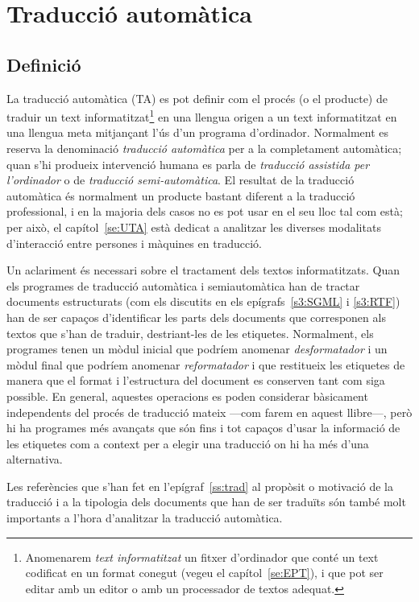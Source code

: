 \section{Traducció automàtica}
\label{ss:TA}

\subsection{Definició}

La traducció automàtica (TA) es pot definir com el procés (o el
producte) de traduir un text informatitzat\footnote{Anomenarem {\em
    text informatitzat} un fitxer d'ordinador que conté un text
  codificat en un format conegut (vegeu el capítol~\ref{se:EPT}), i que pot ser editar amb un editor o amb un processador de textos adequat.  }
en una llengua origen a un text informatitzat en una llengua meta
mitjançant l'ús d'un programa d'ordinador. Normalment es reserva la
denominació \emph{traducció automàtica} per a la completament
automàtica; quan s'hi produeix intervenció humana es parla de {\em
  traducció assistida per l'ordinador} o de \emph{traducció
  semi-automàtica}.  El resultat de la traducció automàtica és
normalment un producte bastant diferent a la traducció professional, i
en la majoria dels casos no es pot usar en el seu lloc tal com
està; per això, el capítol~\ref{se:UTA} està dedicat a analitzar les
diverses modalitats d'interacció entre persones i màquines en
traducció.

Un aclariment és necessari sobre el tractament dels textos
informatitzats. Quan els programes de traducció automàtica i
semiautomàtica han de tractar documents estructurats (com els
discutits en els epígrafs~\ref{s3:SGML} i \ref{s3:RTF}) han de ser
capaços d'identificar les parts dels documents que corresponen als
textos que s'han de traduir, destriant-les de les etiquetes.
Normalment, els programes tenen un mòdul inicial que podríem anomenar
\emph{desformatador} i un mòdul final que podríem anomenar
\emph{reformatador} i que restitueix les etiquetes de manera que el
format i l'estructura del document es conserven tant com siga
possible. En general, aquestes operacions es poden considerar
bàsicament independents del procés de traducció mateix ---com farem en
aquest llibre---, però hi ha programes més avançats que són fins i tot
capaços d'usar la informació de les etiquetes com a context per a
elegir una traducció on hi ha més d'una alternativa.

 Les referències que s'han fet en l'epígraf~\ref{ss:trad} al propòsit o
motivació de la traducció i a la tipologia dels documents que han de
ser traduïts són també molt importants a l'hora d'analitzar la
traducció automàtica.


